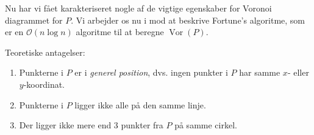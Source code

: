 \documentclass{beamer} %
\newcommand{\longpause}{\break \break \pause}
\DeclareMathOperator{\Vor}{Vor}
\begin{document}

\begin{frame}
\pause
Nu har vi fået karakteriseret nogle af de vigtige egenskaber for Voronoi diagrammet for $P$.
\longpause
Vi arbejder os nu i mod at beskrive Fortune's algoritme, som er en $\mathcal{O}(n \log n)$ algoritme til at beregne $\Vor(P)$.
\end{frame}

\begin{frame}
\pause
Teoretiske antagelser:
\begin{enumerate}
	\pause \item Punkterne i $P$ er i \textit{generel position}, dvs. ingen punkter i $P$ har samme $x$- eller $y$-koordinat.
	\pause \item Punkterne i $P$ ligger ikke alle på den samme linje.
	\pause \item Der ligger ikke mere end 3 punkter fra $P$ på samme cirkel.
\end{enumerate}
\end{frame}
\end{document}
